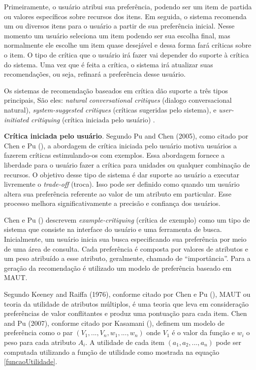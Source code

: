 Primeiramente, o usuário atribui sua preferência, podendo ser um item de partida ou valores específicos sobre recursos dos itens. Em seguida, o sistema recomenda um ou diversos itens para o usuário a partir de sua preferência inicial. Nesse momento um usuário seleciona um item podendo ser sua escolha final, mas normalmente ele escolhe um item quase desejável e dessa forma fará críticas sobre o item. O tipo de crítica que o usuário irá fazer vai depender do suporte à crítica do sistema. Uma vez que é feita a crítica, o sistema irá atualizar suas recomendações, ou seja, refinará a preferência desse usuário.

Os sistemas de recomendação baseados em crítica dão suporte a três tipos principais, São eles: \textit{natural conversational critiques} (dialogo conversacional natural), \textit{system-suggested critiques} (críticas sugeridas pelo sistema), e \textit{user-initiated critiquing} (crítica iniciada pelo usuário) \cite{Chen:2012}.

\textbf{Crítica iniciada pelo usuário}. Segundo Pu and Chen (2005), como citado por Chen e Pu (\citeyear{Chen:2012}), a abordagem de crítica iniciada pelo usuário motiva usuários a fazerem críticas estimulando-os com exemplos. Essa abordagem fornece a liberdade para o usuário fazer a crítica para unidades ou qualquer combinação de recursos. O objetivo desse tipo de sistema é dar suporte ao usuário a executar livremente o \textit{trade-off} (troca). Isso pode ser definido como quando um usuário altera sua preferência referente ao valor de um atributo em particular. Esse processo melhora significativamente a precisão e confiança dos usuários.

Chen e Pu (\citeyear{Chen:2012}) descrevem \textit{example-critiquing} (crítica de exemplo) como um tipo de sistema que consiste na interface do usuário e uma ferramenta de busca. Inicialmente, um usuário inicia sua busca especificando sua preferência por meio de uma área de consulta. Cada preferência é composta por valores de atributos e um peso atribuído a esse atributo, geralmente, chamado de “importância”. Para a geração da recomendação é utilizado um modelo de preferência baseado em MAUT.

Segundo Keeney and Raiffa (1976), conforme citado por Chen e Pu (\citeyear{Chen:2012}), MAUT ou teoria da utilidade de atributos múltiplos, é uma teoria que leva em consideração preferências de valor conflitantes e produz uma pontuação para cada item. Chen and Pu (2007), conforme citado por Kasamani (\citeyear{Kasamani:2017}), definem um modelo de preferência como o par \((V_1, ..., V_n, w_1, ..., w_n)\) onde \(V_1\) é o valor da função e \(w_i\) o peso para cada atributo \(A_i\). A utilidade de cada item \((a_1, a_2, ..., a_n)\) pode ser computada utilizando a função de utilidade como mostrada na equação \eqref{funcaoUtilidade}.

